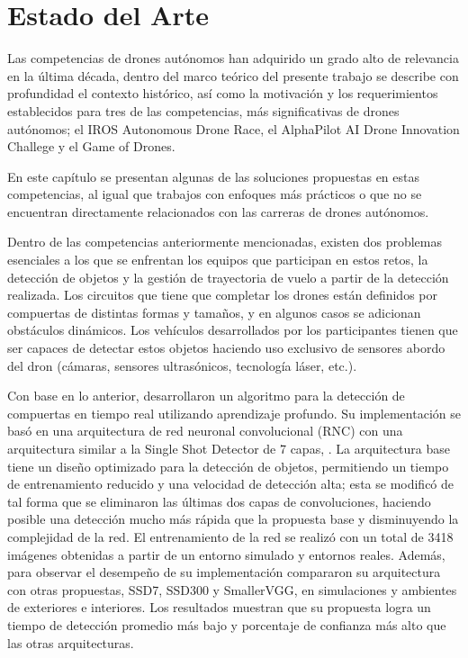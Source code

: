 \chapter{Estado del Arte}

Las competencias de drones autónomos han adquirido un grado alto de relevancia en la última década, dentro del marco teórico del presente trabajo se describe con profundidad el contexto histórico, así como la motivación y los requerimientos establecidos para tres de las competencias, más significativas de drones autónomos; el  IROS Autonomous Drone Race, el AlphaPilot AI Drone Innovation Challege y el Game of Drones. 

En este capítulo se presentan algunas de las soluciones propuestas en estas competencias, al igual que trabajos con enfoques más prácticos o que no se encuentran directamente relacionados con las carreras de drones autónomos.

Dentro de las competencias anteriormente mencionadas, existen dos problemas esenciales a los que se enfrentan los equipos que participan en estos retos, la detección de objetos y la gestión de trayectoria de vuelo a partir de la detección realizada. 
Los circuitos que tiene que completar los drones están definidos por compuertas de distintas formas y tamaños, y en algunos casos se adicionan obstáculos dinámicos. Los vehículos desarrollados por los participantes tienen que ser capaces de detectar estos objetos haciendo uso exclusivo de sensores abordo del dron (cámaras, sensores ultrasónicos, tecnología láser, etc.).

Con base en lo anterior, \citet{cabrera2019gate} desarrollaron un algoritmo para la detección de compuertas en tiempo real utilizando aprendizaje profundo. Su implementación se basó en una arquitectura de red neuronal convolucional (RNC) con una arquitectura similar a la Single Shot Detector de 7 capas, \citet{SSD7}. La arquitectura base tiene un diseño optimizado para la detección de objetos, permitiendo un tiempo de entrenamiento reducido y una velocidad de detección alta; esta se modificó de tal forma que se eliminaron las últimas dos capas de convoluciones, haciendo posible una detección mucho más rápida que la propuesta base y disminuyendo la complejidad de la red. El entrenamiento de la red se realizó con un total de 3418 imágenes obtenidas a partir de un entorno simulado y entornos reales. 
Además, para observar el desempeño de su implementación compararon su arquitectura con otras propuestas, SSD7, SSD300 y SmallerVGG, en simulaciones y ambientes de exteriores e interiores. Los resultados muestran que su propuesta logra un tiempo de detección promedio más bajo y porcentaje de confianza más alto que las otras arquitecturas. 

